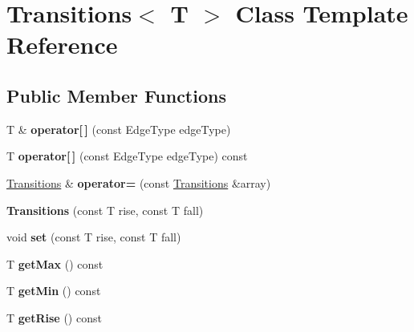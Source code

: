 \hypertarget{classTransitions}{\section{Transitions$<$ T $>$ Class Template Reference}
\label{classTransitions}
}
\subsection*{Public Member Functions}
\begin{DoxyCompactItemize}
\item 
\hypertarget{classTransitions_a79a4be6a8415710583c6c811a27c3b9d}{T \& {\bfseries operator\mbox{[}$\,$\mbox{]}} (const Edge\-Type edge\-Type)}\label{classTransitions_a79a4be6a8415710583c6c811a27c3b9d}

\item 
\hypertarget{classTransitions_af9dddcc4c48658b8adf8739ac139c34f}{T {\bfseries operator\mbox{[}$\,$\mbox{]}} (const Edge\-Type edge\-Type) const }\label{classTransitions_af9dddcc4c48658b8adf8739ac139c34f}

\item 
\hypertarget{classTransitions_a280ca4245034d6f298935392f8172cea}{\hyperlink{classTransitions}{Transitions} \& {\bfseries operator=} (const \hyperlink{classTransitions}{Transitions} \&array)}\label{classTransitions_a280ca4245034d6f298935392f8172cea}

\item 
\hypertarget{classTransitions_a0aae6de65968e98353b1fd9b6f394221}{{\bfseries Transitions} (const T rise, const T fall)}\label{classTransitions_a0aae6de65968e98353b1fd9b6f394221}

\item 
\hypertarget{classTransitions_aa237e34f678bd0aae62be692dc4059dc}{void {\bfseries set} (const T rise, const T fall)}\label{classTransitions_aa237e34f678bd0aae62be692dc4059dc}

\item 
\hypertarget{classTransitions_a59e47d34d366733da94f784c0177f8d9}{T {\bfseries get\-Max} () const }\label{classTransitions_a59e47d34d366733da94f784c0177f8d9}

\item 
\hypertarget{classTransitions_a37bb8749642ad21d22b264f39003d2ce}{T {\bfseries get\-Min} () const }\label{classTransitions_a37bb8749642ad21d22b264f39003d2ce}

\item 
\hypertarget{classTransitions_ad88835ca81b7008ecfb7824bc5c17045}{T {\bfseries get\-Rise} () const }\label{classTransitions_ad88835ca81b7008ecfb7824bc5c17045}


\end{DoxyCompactItemize}
